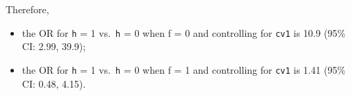 \documentclass[
]{article}
\providecommand{\tightlist}{%
  \setlength{\itemsep}{0pt}\setlength{\parskip}{0pt}}
\begin{document}
Therefore,

\begin{itemize}
\tightlist
\item
  the OR for \texttt{h} = 1 vs.~\texttt{h} = 0 when f = 0 and
  controlling for \texttt{cv1} is 10.9 (95\% CI: 2.99, 39.9);
\item
  the OR for \texttt{h} = 1 vs.~\texttt{h} = 0 when f = 1 and
  controlling for \texttt{cv1} is 1.41 (95\% CI: 0.48, 4.15).
\end{itemize}
\end{document}
